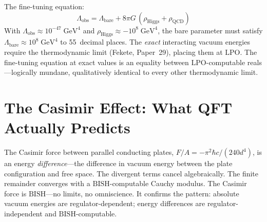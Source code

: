 \documentclass[11pt,a4paper]{report}
\theoremstyle{plain}
\theoremstyle{definition}
\theoremstyle{remark}
\newcommand{\BISH}{\mathrm{BISH}}
\newcommand{\LPO}{\mathrm{LPO}}
\begin{document}
The fine-tuning equation:
\[
  \Lambda_{\mathrm{obs}} = \Lambda_{\mathrm{bare}} + 8\pi G\,(\rho_{\mathrm{Higgs}} + \rho_{\mathrm{QCD}})
\]
With $\Lambda_{\mathrm{obs}} \approx 10^{-47}\;\mathrm{GeV}^4$ and $\rho_{\mathrm{Higgs}} \approx -10^8\;\mathrm{GeV}^4$, the bare parameter must satisfy $\Lambda_{\mathrm{bare}} \approx 10^8\;\mathrm{GeV}^4$ to 55~decimal places. The \emph{exact} interacting vacuum energies require the thermodynamic limit (Fekete, Paper~29), placing them at $\LPO$. The fine-tuning equation at exact values is an equality between $\LPO$-computable reals---logically mundane, qualitatively identical to every other thermodynamic limit.

\section{The Casimir Effect: What QFT Actually Predicts}

The Casimir force between parallel conducting plates, $F/A = -\pi^2\hbar c/(240 d^4)$, is an energy \emph{difference}---the difference in vacuum energy between the plate configuration and free space. The divergent terms cancel algebraically. The finite remainder converges with a $\BISH$-computable Cauchy modulus. The Casimir force is $\BISH$---no limits, no omniscience. It confirms the pattern: absolute vacuum energies are regulator-dependent; energy differences are regulator-independent and $\BISH$-computable.
\end{document}
